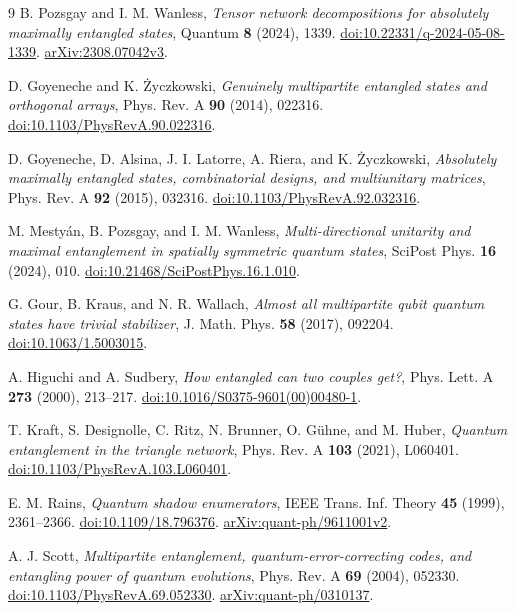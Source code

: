 \documentclass[11pt]{article}
\begin{document}
\begin{thebibliography}{9}
B. Pozsgay and I. M. Wanless,
\emph{Tensor network decompositions for absolutely maximally entangled
states}, Quantum \textbf{8} (2024), 1339.
\href{https://doi.org/10.22331/q-2024-05-08-1339}{doi:10.22331/q-2024-05-08-1339}.
\href{https://arxiv.org/abs/2308.07042v3}{arXiv:2308.07042v3}.

D. Goyeneche and K. \.{Z}yczkowski,
\emph{Genuinely multipartite entangled states and orthogonal arrays},
Phys. Rev. A \textbf{90} (2014), 022316.
\href{https://doi.org/10.1103/PhysRevA.90.022316}{doi:10.1103/PhysRevA.90.022316}.

D. Goyeneche, D. Alsina, J. I. Latorre, A. Riera, and K. \.{Z}yczkowski,
\emph{Absolutely maximally entangled states, combinatorial designs, and
multiunitary matrices}, Phys. Rev. A \textbf{92} (2015), 032316.
\href{https://doi.org/10.1103/PhysRevA.92.032316}{doi:10.1103/PhysRevA.92.032316}.

M. Mesty\'an, B. Pozsgay, and I. M. Wanless,
\emph{Multi-directional unitarity and maximal entanglement in spatially
symmetric quantum states}, SciPost Phys. \textbf{16} (2024), 010.
\href{https://doi.org/10.21468/SciPostPhys.16.1.010}{doi:10.21468/SciPostPhys.16.1.010}.

G. Gour, B. Kraus, and N. R. Wallach,
\emph{Almost all multipartite qubit quantum states have trivial stabilizer},
J. Math. Phys. \textbf{58} (2017), 092204.
\href{https://doi.org/10.1063/1.5003015}{doi:10.1063/1.5003015}.

A. Higuchi and A. Sudbery,
\emph{How entangled can two couples get?}, Phys. Lett. A
\textbf{273} (2000), 213--217.
\href{https://doi.org/10.1016/S0375-9601(00)00480-1}{doi:10.1016/S0375-9601(00)00480-1}.

T. Kraft, S. Designolle, C. Ritz, N. Brunner, O. G\"uhne, and M. Huber,
\emph{Quantum entanglement in the triangle network}, Phys. Rev. A
\textbf{103} (2021), L060401.
\href{https://doi.org/10.1103/PhysRevA.103.L060401}{doi:10.1103/PhysRevA.103.L060401}.

E. M. Rains,
\emph{Quantum shadow enumerators}, IEEE Trans. Inf. Theory
\textbf{45} (1999), 2361--2366.
\href{https://doi.org/10.1109/18.796376}{doi:10.1109/18.796376}.
\href{https://arxiv.org/abs/quant-ph/9611001v2}{arXiv:quant-ph/9611001v2}.

A. J. Scott,
\emph{Multipartite entanglement, quantum-error-correcting codes, and
entangling power of quantum evolutions}, Phys. Rev. A
\textbf{69} (2004), 052330.
\href{https://doi.org/10.1103/PhysRevA.69.052330}{doi:10.1103/PhysRevA.69.052330}.
\href{https://arxiv.org/abs/quant-ph/0310137}{arXiv:quant-ph/0310137}.
\end{thebibliography}
\end{document}
